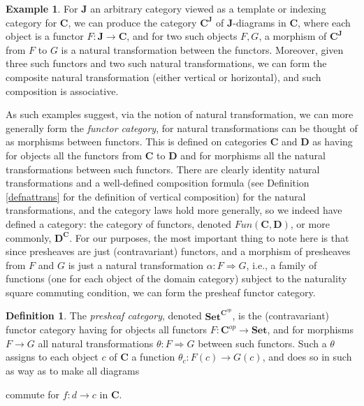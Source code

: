 \documentclass[11pt]{book}
\theoremstyle{definition}
\newtheorem{example}{Example}[section]
\theoremstyle{definition}
\newtheorem{definition}{Definition}[section]
\theoremstyle{definition}
\theoremstyle{theorem}
\theoremstyle{definition}
\begin{document}
\begin{example}
	For \textbf{J} an arbitrary category viewed as a template or indexing category  for \textbf{C}, we can produce the category $\textbf{C}^{\textbf{J}}$ of $\textbf{J}$-diagrams in \textbf{C}, where each object is a functor $F: \textbf{J} \rightarrow \textbf{C}$, and for two such objects $F, G$, a morphism of $\textbf{C}^{\textbf{J}}$ from $F$ to $G$ is a natural transformation between the functors. Moreover, given three such functors and two such natural transformations, we can form the composite natural transformation (either vertical or horizontal), and such composition is associative.
\end{example}
As such examples suggest, via the notion of natural transformation, we can more generally form the \textit{functor category}, for natural transformations can be thought of as morphisms between functors. This is defined on categories \textbf{C} and \textbf{D} as having for objects all the functors from \textbf{C} to \textbf{D} and for morphisms all the natural transformations between such functors. There are clearly identity natural transformations and a well-defined composition formula (see Definition \ref{defnattrans} for the definition of vertical composition) for the natural transformations, and the category laws hold more generally, so we indeed have defined a category: the category of functors, denoted $Fun(\textbf{C}, \textbf{D})$, or more commonly, $\textbf{D}^{\textbf{C}}$. For our purposes, the most important thing to note here is that since presheaves are just (contravariant) functors, and a morphism of presheaves from $F$ and $G$ is just a natural transformation $\alpha: F \Rightarrow G$, i.e., a family of functions (one for each object of the domain category) subject to the naturality square commuting condition, we can form the presheaf functor category.  
\begin{definition}
	The \textit{presheaf category}, denoted $\textbf{Set}^{\textbf{C}^{op}}$, is the (contravariant) functor category having for objects all functors $F: \textbf{C}^{op} \rightarrow \textbf{Set}$, and for morphisms $F \rightarrow G$ all natural transformations $\theta: F \Rightarrow G$ between such functors. Such a $\theta$ assigns to each object $c$ of \textbf{C} a function $\theta_c: F(c) \rightarrow G(c)$, and does so in such as way as to make all diagrams 
	\begin{center} 
	\end{center} 
	commute for $f: d \rightarrow c$ in \textbf{C}.
\end{definition}
\end{document}
